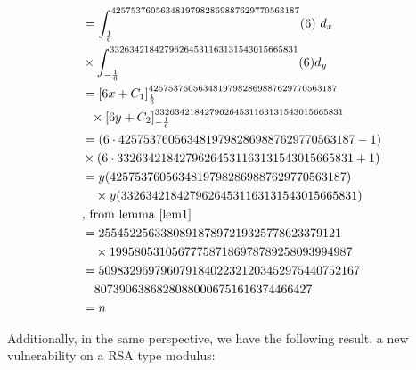 \documentclass[sigconf,balance=false]{acmart}
\begin{document}
\begin{example}
{\begin{itemize}
\begin{align*}
&=\displaystyle\int_{\frac{1}{6}}^{42575376056348197982869887629770563187} (6)\ d_{x}\\
&\times\int_{-\frac{1}{6}}^{33263421842796264531163131543015665831}(6)d_{y}\\
&=\displaystyle\left[6x+ C_{1} \right]_{\frac{1}{6}}^{42575376056348197982869887629770563187}\\  
& \ \ \times\displaystyle\left[6y+ C_{2} \right]_{- \frac{1}{6}}^{33263421842796264531163131543015665831}\\
&=\displaystyle\left(6\cdot 42575376056348197982869887629770563187-1 \right)\\ 
&\times \left(6\cdot 33263421842796264531163131543015665831+ 1 \right) \\
&=y(42575376056348197982869887629770563187)\\
& \ \ \ \times  y(33263421842796264531163131543015665831)\\
& \text{, from lemma \ref{lem1}}\\
&=255452256338089187897219325778623379121\\
&\ \ \ \times 199580531056777587186978789258093994987\\
&=509832969796079184022321203452975440752167\\
& \ \ \ 80739063868280880006751616374466427\\
&=n
\end{align*}
\end{itemize}
}
\end{example}

Additionally, in the same perspective, we have the following result, a new vulnerability on a RSA type modulus:
\end{document}
